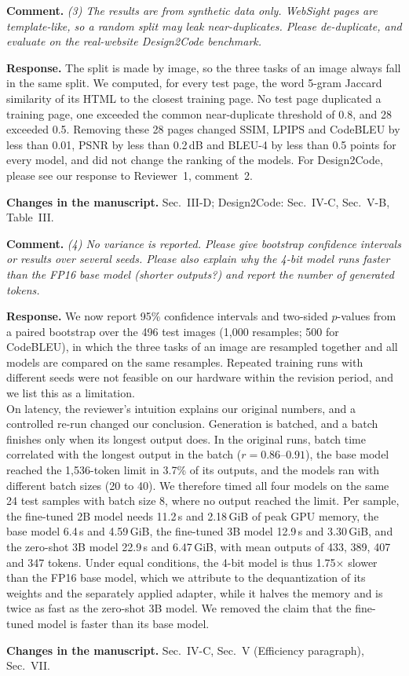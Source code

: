 \documentclass[11pt,a4paper]{article}
\newcommand{\rev}[1]{\par\noindent\textbf{Comment.} \textit{#1}\par}
\newcommand{\resp}{\par\noindent\textbf{Response.} }
\newcommand{\change}[1]{\par\noindent\textbf{Changes in the manuscript.} #1\par\medskip}
\begin{document}
\rev{(3) The results are from synthetic data only. WebSight pages are
template-like, so a random split may leak near-duplicates. Please de-duplicate,
and evaluate on the real-website Design2Code benchmark.}
\resp The split is made by image, so the three tasks of an image always fall in
the same split. We computed, for every test page, the word 5-gram Jaccard
similarity of its HTML to the closest training page. No test page duplicated a
training page, one exceeded the common near-duplicate threshold of 0.8, and 28
exceeded 0.5. Removing these 28 pages changed SSIM, LPIPS and CodeBLEU by less
than 0.01, PSNR by less than 0.2\,dB and BLEU-4 by less than 0.5 points for every
model, and did not change the ranking of the models. For Design2Code, please see
our response to Reviewer~1, comment~2.
\change{Sec.~III-D; Design2Code: Sec.~IV-C, Sec.~V-B, Table~III.}

\rev{(4) No variance is reported. Please give bootstrap confidence intervals or
results over several seeds. Please also explain why the 4-bit model runs faster
than the FP16 base model (shorter outputs?) and report the number of generated
tokens.}
\resp We now report 95\% confidence intervals and two-sided $p$-values from a
paired bootstrap over the 496 test images (1,000 resamples; 500 for CodeBLEU),
in which the three tasks of an image are resampled together and all models are
compared on the same resamples. Repeated training runs with different seeds were
not feasible on our hardware within the revision period, and we list this as a
limitation.\\
On latency, the reviewer's intuition explains our original numbers, and a
controlled re-run changed our conclusion. Generation is batched, and a batch
finishes only when its longest output does. In the original runs, batch time
correlated with the longest output in the batch ($r=0.86$--$0.91$), the base
model reached the 1,536-token limit in 3.7\% of its outputs, and the models ran
with different batch sizes (20 to 40). We therefore timed all four models on the
same 24 test samples with batch size 8, where no output reached the limit. Per
sample, the fine-tuned 2B model needs 11.2\,s and 2.18\,GiB of peak GPU memory,
the base model 6.4\,s and 4.59\,GiB, the fine-tuned 3B model 12.9\,s and
3.30\,GiB, and the zero-shot 3B model 22.9\,s and 6.47\,GiB, with mean outputs of
433, 389, 407 and 347 tokens. Under equal conditions, the 4-bit model is thus
1.75$\times$ slower than the FP16 base model, which we attribute to the
dequantization of its weights and the separately applied adapter, while it halves
the memory and is twice as fast as the zero-shot 3B model. We removed the claim
that the fine-tuned model is faster than its base model.
\change{Sec.~IV-C, Sec.~V (Efficiency paragraph), Sec.~VII.}
\end{document}
